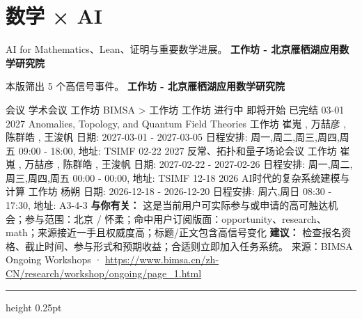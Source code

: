 \documentclass[10.5pt]{ctexart}
\begin{document}
\section*{数学 × AI}
{\color{ormuted} AI for Mathematics、Lean、证明与重要数学进展。}
\vspace{2mm}
{\LARGE\bfseries 工作坊 - 北京雁栖湖应用数学研究院}\par
\vspace{1mm}
{\color{ormuted} 本版筛出 5 个高信号事件。}
\vspace{3mm}
{\Large\bfseries 工作坊 - 北京雁栖湖应用数学研究院}\par
会议 学术会议 工作坊 BIMSA > 工作坊 工作坊 进行中 即将开始 已完结 03-01 2027 Anomalies, Topology, and Quantum Field Theories 工作坊 崔嵬 , 万喆彦 , 陈群皓 , 王浚帆 日期: 2027-03-01 - 2027-03-05 日程安排: 周一,周二,周三,周四,周五 09:00 - 18:00, 地址: TSIMF 02-22 2027 反常、拓扑和量子场论会议 工作坊 崔嵬 , 万喆彦 , 陈群皓 , 王浚帆 日期: 2027-02-22 - 2027-02-26 日程安排: 周一,周二,周三,周四,周五 00:00 - 00:00, 地址: TSIMF 12-18 2026 AI时代的复杂系统建模与计算 工作坊 杨朔 日期: 2026-12-18 - 2026-12-20 日程安排: 周六,周日 08:30 - 17:30, 地址: A3-4-3
\textbf{与你有关：} 这是当前用户可实际参与或申请的高可触达机会；参与范围：北京 / 怀柔；命中用户订阅版面：opportunity、research、math；来源接近一手且权威度高；标题/正文包含高信号变化
\textbf{建议：} 检查报名资格、截止时间、参与形式和预期收益；合适则立即加入任务系统。
{\footnotesize\color{ormuted} 来源：BIMSA Ongoing Workshops · \url{https://www.bimsa.cn/zh-CN/research/workshop/ongoing/page_1.html}}
\vspace{4mm}
\hrule height 0.25pt
\vspace{3mm}
\end{document}
